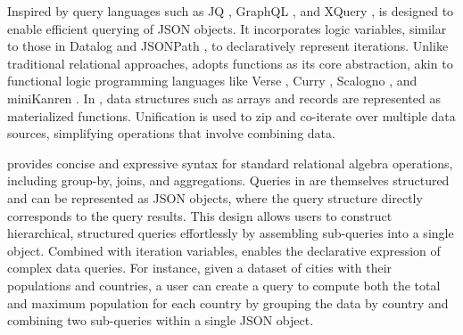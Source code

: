 \documentclass[acmsmall,nonacm]{acmart}\settopmatter{printfolios=true,printccs=false,printacmref=false}
\newcommand{\rhyme}{\text{Rhyme}\xspace}
\begin{document}

Inspired by query languages such as JQ \cite{jq}, GraphQL \cite{graphql}, and XQuery \cite{xquery}, \rhyme is designed to enable efficient querying of JSON objects. It incorporates logic variables, similar to those in Datalog \cite{datalog} and JSONPath \cite{jsonpath}, to declaratively represent iterations. Unlike traditional relational approaches, \rhyme adopts functions as its core abstraction, akin to functional logic programming languages like Verse \cite{verse}, Curry \cite{curry}, Scalogno \cite{scalogno}, and miniKanren \cite{miniKanren}. In \rhyme, data structures such as arrays and records are represented as materialized functions. Unification is used to zip and co-iterate over multiple data sources, simplifying operations that involve combining data.

\rhyme provides concise and expressive syntax for standard relational algebra operations, including group-by, joins, and aggregations. Queries in \rhyme are themselves structured and can be represented as JSON objects, where the query structure directly corresponds to the query results. This design allows users to construct hierarchical, structured queries effortlessly by assembling sub-queries into a single object. Combined with iteration variables, \rhyme enables the declarative expression of complex data queries. For instance, given a dataset of cities with their populations and countries, a user can create a query to compute both the total and maximum population for each country by grouping the data by country and combining two sub-queries within a single JSON object.
\end{document}
